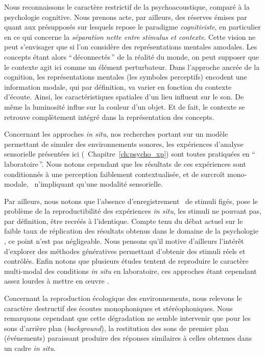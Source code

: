 Nous reconnaissons le caractère restrictif de la psychoacoustique, comparé à la psychologie cognitive. Nous prenons acte, par ailleurs, des réserves émises par \cite{maffiolo_caracterisation_1999} quant aux présupposés sur lesquels repose le paradigme \emph{cognitiviste}, en particulier en ce qui concerne la \emph{séparation nette entre stimulus et contexte}. Cette vision ne peut s'envisager que si l'on considère des représentations mentales amodales. Les concepts étant alors ``\,déconnectés\,'' de la réalité du monde, on peut supposer que le contexte agit ici comme un élément perturbateur. Dans l'approche ancrée de la cognition, les représentations mentales (les symboles perceptifs) encodent une information modale, qui par définition, va varier en fonction du contexte d'écoute. Ainsi, les caractéristiques spatiales d'un lieu influent sur le son. De même la luminosité influe sur la couleur d'un objet. Et de fait, le contexte se retrouve complètement intégré dans la représentation des concepts.

Concernant les approches \emph{in situ}, nos recherches portant sur un modèle permettant de simuler des environnements sonores, les expériences d'analyse sensorielle présentées ici (\cf~Chapitre~\ref{ch:psycho_xp}) sont toutes pratiquées en ``\,laboratoire\,''. Nous notons cependant que les résultats de ces expériences sont conditionnés à une perception faiblement contextualisée, et de surcroît mono-modale, \ie~n'impliquant qu'une modalité sensorielle.

Par ailleurs, nous notons que l'absence d'enregistrement \ie~de stimuli figés, pose le problème de la reproductibilité des expériences \emph{in situ}, les stimuli ne pouvant pas, par définition, être recréés à l'identique. Compte tenu du débat actuel sur le faible taux de réplication des résultats obtenus dans le domaine de la psychologie \citep{spellman2015short}, ce point n'est pas négligeable. Nous pensons qu'il motive d'ailleurs l'intérêt d'explorer des méthodes génératives permettant d'obtenir des stimuli réels et contrôlés. Enfin notons que plusieurs études tentent de reproduire le caractère multi-modal des conditions \emph{in situ} en laboratoire, ces approches étant cependant assez lourdes à mettre en œuvre \citep{woloszyn1997vers,morel2016noise}.

Concernant la reproduction écologique des environnements, nous relevons le caractère destructif des écoutes monophoniques et stéréophoniques. Nous remarquons cependant que cette dégradation ne semble intervenir que pour les sons d'arrière plan (\emph{background}), la restitution des sons de premier plan (événements) paraissant produire des réponses similaires à celles obtenues dans un cadre \emph{in situ}.

